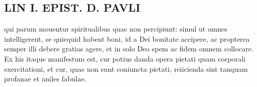 \documentclass{article}
\begin{document}
\begin{pages}
\section*{LIN I. EPIST. D. PAVLI }
\marginpar{[ p.99 ]}\pstart qui parum mouentur spiritualibus quae non percipiunt: simul ut omnes intelligerent, se quicquid habent boni, id a Dei bonitate accipere, ac propterea semper illi debere gratias agere, et in solo Deo spem ac fidem omnem collocare. Ex his itaque manifestum est, cur potius danda opera pietati quam corporali exercitationi, et cur, quae non sunt coniuncta pietati, reiicienda sint tanquam profanae et aniles fabulae.  \pend
{}
{}

\end{pages}
\end{document}
